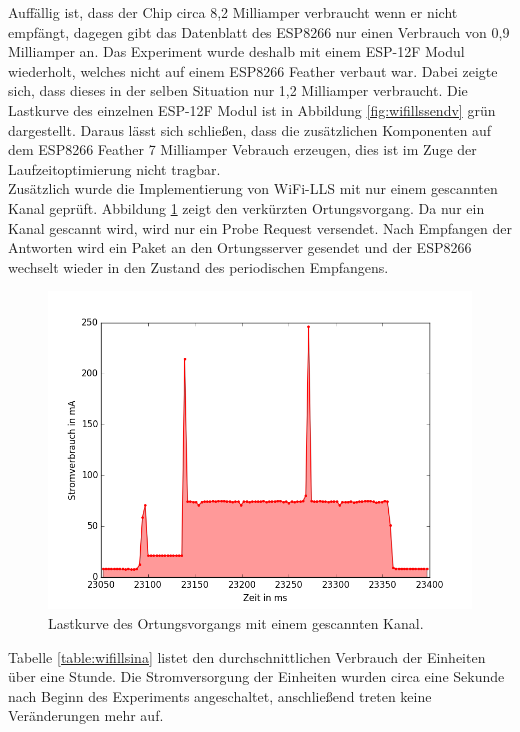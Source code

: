 Auffällig ist, dass der Chip circa 8,2 Milliamper verbraucht wenn er nicht empfängt, dagegen gibt das Datenblatt des ESP8266 nur einen Verbrauch von 0,9 Milliamper an.
Das Experiment wurde deshalb mit einem ESP-12F Modul wiederholt, welches nicht auf einem ESP8266 Feather verbaut war. 
Dabei zeigte sich, dass dieses in der selben Situation nur 1,2 Milliamper verbraucht.
Die Lastkurve des einzelnen ESP-12F Modul ist in Abbildung \ref{fig:wifillssendv} grün dargestellt.
Daraus lässt sich schließen, dass die zusätzlichen Komponenten auf dem ESP8266 Feather 7 Milliamper Vebrauch erzeugen, dies ist im Zuge der Laufzeitoptimierung nicht tragbar.\\
Zusätzlich wurde die Implementierung von WiFi-LLS mit nur einem gescannten Kanal geprüft.
Abbildung \ref{fig:wifills1chsend} zeigt den verkürzten Ortungsvorgang.
Da nur ein Kanal gescannt wird, wird nur ein Probe Request versendet.
Nach Empfangen der Antworten wird ein Paket an den Ortungsserver gesendet und der ESP8266 wechselt wieder in den Zustand des periodischen Empfangens.\\

\begin{figure}[h!]
  \centering
	\includegraphics[width=\textwidth]{plots/wifills1chsend.png}
  \caption{Lastkurve des Ortungsvorgangs mit einem gescannten Kanal.}
  \label{fig:wifills1chsend}
\end{figure}

Tabelle \ref{table:wifillsina} listet den durchschnittlichen Verbrauch der Einheiten über eine Stunde.
Die Stromversorgung der Einheiten wurden circa eine Sekunde nach Beginn des Experiments angeschaltet, anschließend treten keine Veränderungen mehr auf.

